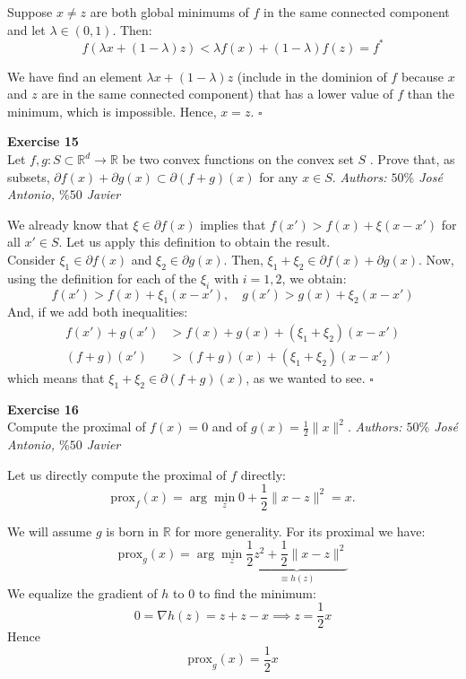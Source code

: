 \documentclass[11pt,table]{article}
\newcommand{\qed}{\hfill $\square$}
\newenvironment{problem}[2][Exercise]
{ \begin{mdframed}[backgroundcolor=gray!20] \textbf{#1 #2} \\}
	{\hspace{0.0cm}\newline\newline \emph{Authors: \(50\%\) José Antonio, \(\%50\) Javier}  \end{mdframed}}
\newcommand\R{\mathbb R}
\begin{document}
Suppose $x \neq z$ are both global minimums of $f$ in the same connected component and let $\lambda \in (0,1)$. Then:
\[
	f(\lambda x + (1-\lambda)z) < \lambda f(x) + (1-\lambda) f(z) = f^*
\]

We have find an element $\lambda x + (1-\lambda)z$ (include in the dominion of $f$ because $x$ and $z$ are in the same connected component) that has a lower value of $f$ than the minimum, which is impossible. Hence, $x = z$. \qed \\

\begin{problem}{15}
Let \( f,g: S \subset \mathbb{R}^d \to \mathbb{R} \)  be two convex functions on the convex set \( S \) . Prove that, as subsets, \(  \partial f(x) + \partial g(x) \subset \partial(f+g)(x) \) for any $x\in S$.
\end{problem}

We already know that \(\xi \in \partial f(x)\) implies that \(f(x') > f(x) + \xi(x-x')\) for all \(x' \in S\). Let us apply this definition to obtain the result.\\
Consider \(\xi_1 \in \partial f(x)\) and \(\xi_2 \in \partial g(x)\). Then, \(\xi_1 + \xi_2 \in \partial f(x) + \partial g(x)\). Now, using the definition for each of the \(\xi_i\) with \(i = 1,2\), we obtain:
\[
	f(x') > f(x) + \xi_1 (x-x'), \quad g(x') > g(x) + \xi_2(x-x')
\]
And, if we add both inequalities:
\begin{align*}
	f(x') + g(x')        & > f(x) + g(x) + (\xi_1 + \xi_2)(x-x')        \\
	\left(f+g\right)(x') & >\left(f+g\right)(x) + (\xi_1 + \xi_2)(x-x')
\end{align*}
which means that \(\xi_1 + \xi_2 \in \partial \left(f+g\right)(x) \), as we wanted to see. \qed \\

\begin{problem}{16}
Compute the proximal of \( f(x) = 0 \) and of \( g(x) = \frac{1}{2}\|x\|^2 \).
\end{problem}

Let us directly compute the proximal of $f$ directly:
\[
	\text{prox}_f(x) = \arg \min_z 0 + \frac{1}{2} \parallel x - z \parallel^2 = x.
\]

We will assume $g$ is born in $\R$ for more generality. For its proximal we have:
\[
	\text{prox}_g(x) = \arg \min_z \underbrace{\frac{1}{2}z^2 + \frac{1}{2} \parallel x - z \parallel^2}_{\equiv h(z)}
\]
We equalize the gradient of $h$ to $0$ to find the minimum:
\[
	0 = \nabla h(z) = z + z - x \implies z = \frac{1}{2}x
\]
Hence
\[
	\text{prox}_g(x) =  \frac{1}{2} x
\] \\
\end{document}
